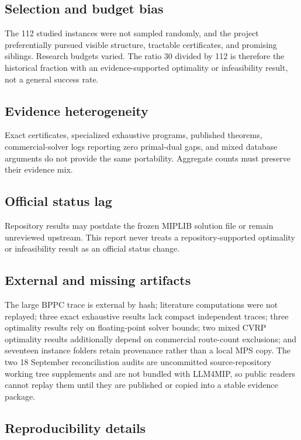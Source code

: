 \documentclass[11pt,letterpaper]{article}
\begin{document}
\subsection{Selection and budget bias}

The 112 studied instances were not sampled randomly, and the project preferentially pursued visible structure, tractable certificates, and promising siblings. Research budgets varied. The ratio 30 divided by 112 is therefore the historical fraction with an evidence-supported optimality or infeasibility result, not a general success rate.

\subsection{Evidence heterogeneity}

Exact certificates, specialized exhaustive programs, published theorems, commercial-solver logs reporting zero primal-dual gaps, and mixed database arguments do not provide the same portability. Aggregate counts must preserve their evidence mix.

\subsection{Official status lag}

Repository results may postdate the frozen MIPLIB solution file or remain unreviewed upstream. This report never treats a repository-supported optimality or infeasibility result as an official status change.

\subsection{External and missing artifacts}

The large BPPC trace is external by hash; literature computations were not replayed; three exact exhaustive results lack compact independent traces; three optimality results rely on floating-point solver bounds; two mixed CVRP optimality results additionally depend on commercial route-count exclusions; and seventeen instance folders retain provenance rather than a local MPS copy. The two 18 September reconciliation audits are uncommitted source-repository working tree supplements and are not bundled with LLM4MIP, so public readers cannot replay them until they are published or copied into a stable evidence package.

\subsection{Reproducibility details}
\end{document}
